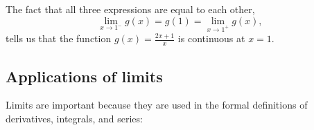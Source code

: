 		\noindent
		The fact that all three expressions %
		are equal to each other,
		\[
			\lim_{x \to 1^-} g(x) = g(1) = \lim_{x \to 1^+} g(x),
		\]
		tells us that the function $g(x)=\frac{2x+1}{x}$ is continuous at $x=1$.









	\subsection{Applications of limits}

		Limits are important because they are used in the formal definitions of derivatives, integrals, and series:

